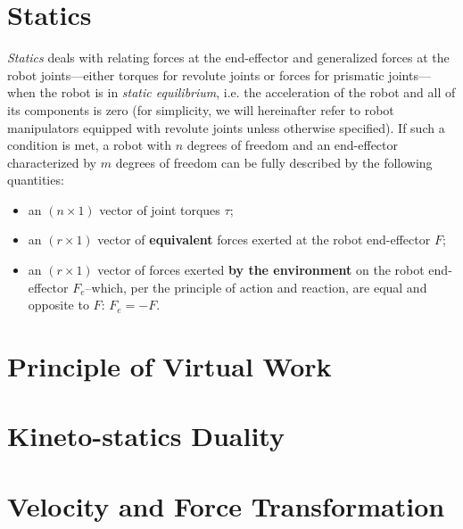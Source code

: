 \section{Statics}

\emph{Statics} deals with relating forces at the end-effector and generalized forces at the robot joints---either torques for revolute joints or forces for prismatic joints---when the robot is in \emph{static equilibrium}, i.e. the acceleration of the robot and all of its components is zero
(for simplicity, we will hereinafter refer to robot manipulators equipped with revolute joints unless otherwise specified).
If such a condition is met, a robot with $n$ degrees of freedom and an end-effector characterized by $m$ degrees of freedom can be fully described by the following quantities:
\begin{itemize}
    \item an $\left( n \times 1 \right)$ vector of joint torques $\tau$;
    \item an $\left( r \times 1 \right)$ vector of \textbf{equivalent} forces exerted at the robot end-effector $F$;
    \item an $\left( r \times 1 \right)$ vector of forces exerted \textbf{by the environment} on the robot end-effector $F_e$--which, per the principle of action and reaction, are equal and opposite to $F$: $F_e=-F$.
\end{itemize}

\vskip 40pt

\section{Principle of Virtual Work}

\section{Kineto-statics Duality}

\section{Velocity and Force Transformation}
